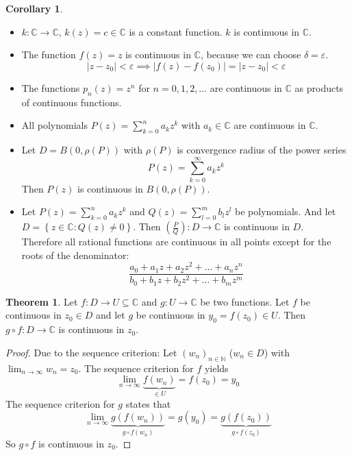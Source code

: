 \documentclass[a4paper,landscape,twocolumn]{article}
\theoremstyle{definition}
\newtheorem{theorem}{Theorem}
\newtheorem{cor}{Corollary}
\newcommand\set[1]{\left\{#1\right\}}
\newcommand\abs[1]{\left|#1\right|}
\newcommand\seq[1]{{\left(#1\right)}_{n \in \mathbb N}}
\begin{document}
\begin{cor}
  \hfill{}
  \begin{itemize}
    \item $k: \mathbb C \to \mathbb C$, $k(z) = c \in \mathbb C$ is a constant function.
      $k$ is continuous in $\mathbb C$.
    \item The function $f(z) = z$ is continuous in $\mathbb C$, because we can choose $\delta = \varepsilon$.
      \[ \abs{z - z_0} < \varepsilon \implies \abs{f(z) - f(z_0)} = \abs{z - z_0} < \varepsilon \]
    \item The functions $p_n(z) = z^n$ for $n = 0,1,2,\ldots$ are continuous in $\mathbb C$ as products of continuous functions.
    \item All polynomials $P(z) = \sum_{k=0}^n a_k z^k$ with $a_k \in \mathbb C$ are continuous in $\mathbb C$.
    \item Let $D = B(0, \rho(P))$ with $\rho(P)$ is convergence radius of the power series
      \[ P(z) = \sum_{k=0}^\infty a_k z^k \]
      Then $P(z)$ is continuous in $B(0, \rho(P))$.
    \item Let $P(z) = \sum_{k=0}^n a_k z^k$ and $Q(z) = \sum_{l=0}^m b_l z^l$ be polynomials.
      And let $D = \set{z \in \mathbb C: Q(z) \neq 0}$. Then $\left(\frac PQ\right): D \to \mathbb C$
      is continuous in $D$. \\
      Therefore all rational functions are continuous in all points except for the roots of the denominator:
      \[ \frac{a_0 + a_1 z + a_2 z^2 + \ldots + a_n z^n}{b_0 + b_1 z + b_2 z^2 + \ldots + b_m z^m} \]
  \end{itemize}
\end{cor}

\begin{theorem}
  Let $f: D \to U \subseteq \mathbb C$ and $g: U \to \mathbb C$ be two functions.
  Let $f$ be continuous in $z_0 \in D$ and let $g$ be continuous in $y_0 = f(z_0) \in U$.
  Then $g \circ f: D \to \mathbb C$ is continuous in $z_0$.
\end{theorem}
\begin{proof}
  Due to the sequence criterion: Let $\seq{w_n}$ ($w_n \in D$) with $\lim_{n\to\infty} w_n = z_0$.
  The sequence criterion for $f$ yields
  \[ \lim_{n\to\infty} \underbrace{f(w_n)}_{\in U} = f(z_0) = y_0 \]
  The sequence criterion for $g$ states that
  \[ \lim_{n\to\infty} \underbrace{g(f(w_n))}_{g \circ f(w_n)} = g(y_0) = \underbrace{g(f(z_0))}_{g \circ f(z_0)} \]
  So $g \circ f$ is continuous in $z_0$.
\end{proof}
\end{document}
